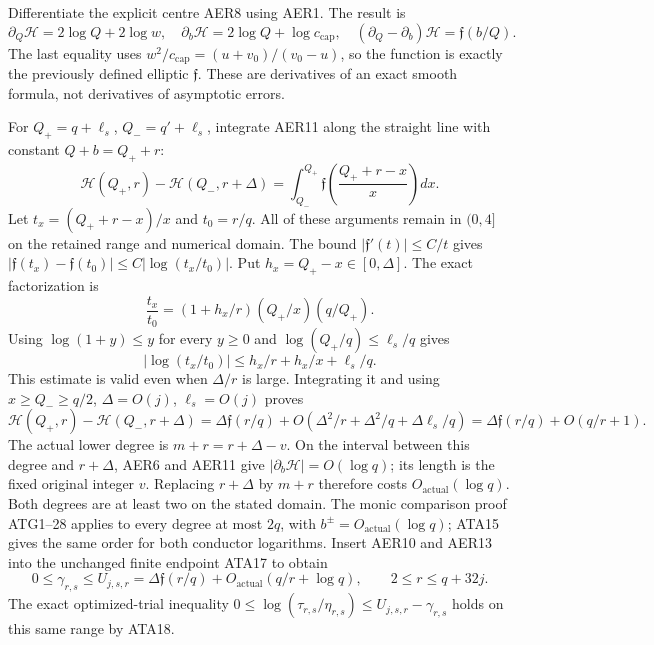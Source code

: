Differentiate the explicit centre AER8 using AER1.  The result is
\[
 \partial_Q\mathcal H=2\log Q+2\log w,\quad
 \partial_b\mathcal H=2\log Q+\log c_{\mathrm{cap}},\quad
 (\partial_Q-\partial_b)\mathcal H=\mathfrak f(b/Q).
                                                               \tag{AER11}
\]
The last equality uses
$w^2/c_{\mathrm{cap}}=(u+v_0)/(v_0-u)$, so the function is exactly
the previously defined elliptic $\mathfrak f$.  These are derivatives
of an exact smooth formula, not derivatives of asymptotic errors.

For $Q_+=q+\ell_s$, $Q_-=q'+\ell_s$, integrate AER11 along the
straight line with constant $Q+b=Q_++r$:
\[
 \mathcal H(Q_+,r)-\mathcal H(Q_-,r+\Delta)
 =\int_{Q_-}^{Q_+}
       \mathfrak f\left(\frac{Q_++r-x}{x}\right)dx.      \tag{AER12}
\]
Let $t_x=(Q_++r-x)/x$ and $t_0=r/q$.  All of these arguments
remain in $(0,4]$ on the retained range and numerical domain.
The bound $|\mathfrak f'(t)|\le C/t$ gives
$|\mathfrak f(t_x)-\mathfrak f(t_0)|\le C|\log(t_x/t_0)|$.
Put $h_x=Q_+-x\in[0,\Delta]$.  The exact factorization is
\[
 \frac{t_x}{t_0}=
       (1+h_x/r)(Q_+/x)(q/Q_+).
\]
Using $\log(1+y)\le y$ for every $y\ge0$ and
$\log(Q_+/q)\le\ell_s/q$ gives
\[
 |\log(t_x/t_0)|\le h_x/r+h_x/x+\ell_s/q.
\]
This estimate is valid even when $\Delta/r$ is large.  Integrating
it and using $x\ge Q_-\ge q/2$, $\Delta=O(j)$,
$\ell_s=O(j)$ proves
\[
 \mathcal H(Q_+,r)-\mathcal H(Q_-,r+\Delta)
 =\Delta\mathfrak f(r/q)
       +O(\Delta^2/r+\Delta^2/q+\Delta\ell_s/q)
 =\Delta\mathfrak f(r/q)+O(q/r+1).                     \tag{AER13}
\]
The actual lower degree is $m+r=r+\Delta-v$.
On the interval between this degree and $r+\Delta$, AER6 and
AER11 give $|\partial_b\mathcal H|=O(\log q)$; its length is the
fixed original integer $v$.  Replacing $r+\Delta$ by $m+r$
therefore costs $O_{\mathrm{actual}}(\log q)$.
Both degrees are at least two on the stated domain.
The monic comparison proof ATG1--28 applies to every degree at most
$2q$, with $b^\pm=O_{\mathrm{actual}}(\log q)$; ATA15 gives the same
order for both conductor logarithms.  Insert AER10 and AER13 into
the unchanged finite endpoint ATA17 to obtain
\[
 \boxed{\quad
 0\le\gamma_{r,s}\le U_{j,s,r}
       =\Delta\mathfrak f(r/q)+O_{\mathrm{actual}}(q/r+\log q),
 \qquad 2\le r\le q+32j.
 \quad}                                                \tag{AER14}
\]
The exact optimized-trial inequality
$0\le\log(\tau_{r,s}/\eta_{r,s})\le U_{j,s,r}-\gamma_{r,s}$
holds on this same range by ATA18.

